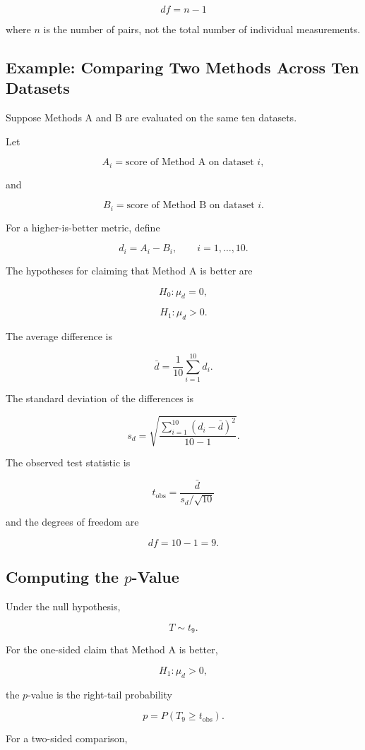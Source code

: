 \documentclass[11pt]{article}
\begin{document}
\[
\boxed{df=n-1}
\]

where \(n\) is the number of pairs, not the total number of individual
measurements.

\subsection{Example: Comparing Two Methods Across Ten Datasets}

Suppose Methods A and B are evaluated on the same ten datasets.

Let

\[
A_i=\text{score of Method A on dataset }i,
\]

and

\[
B_i=\text{score of Method B on dataset }i.
\]

For a higher-is-better metric, define

\[
d_i=A_i-B_i,
\qquad i=1,\ldots,10.
\]

The hypotheses for claiming that Method A is better are

\[
H_0:\mu_d=0,
\]

\[
H_1:\mu_d>0.
\]

The average difference is

\[
\bar{d}
=
\frac{1}{10}\sum_{i=1}^{10}d_i.
\]

The standard deviation of the differences is

\[
s_d
=
\sqrt{
\frac{
\sum_{i=1}^{10}(d_i-\bar{d})^2
}{
10-1
}
}.
\]

The observed test statistic is

\[
\boxed{
t_{\mathrm{obs}}
=
\frac{\bar{d}}{s_d/\sqrt{10}}
}
\]

and the degrees of freedom are

\[
\boxed{df=10-1=9}.
\]

\subsection{Computing the \(p\)-Value}

Under the null hypothesis,

\[
T\sim t_9.
\]

For the one-sided claim that Method A is better,

\[
H_1:\mu_d>0,
\]

the \(p\)-value is the right-tail probability

\[
\boxed{
p=P(T_9\geq t_{\mathrm{obs}})
}.
\]

For a two-sided comparison,
\end{document}
